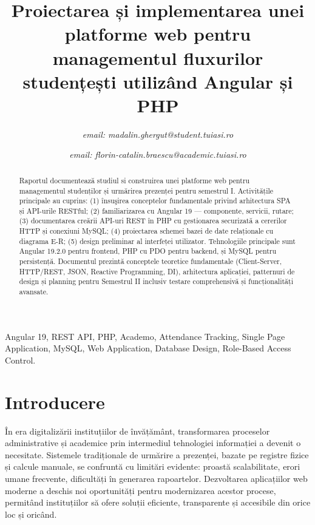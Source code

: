 \documentclass[conference]{IEEEtran}
\begin{document}
\title{Proiectarea și implementarea unei platforme web pentru managementul fluxurilor studențești utilizând Angular și PHP}

\author{
    \textit{email: madalin.ghergut@student.tuiasi.ro}
    \and
    \textit{email: florin-catalin.braescu@academic.tuiasi.ro}

}

\maketitle

\begin{abstract}
    Raportul documentează studiul si construirea unei platforme web pentru managementul studenților și urmărirea prezenței pentru semestrul I.
    Activitățile principale au cuprins: (1) însuşirea conceptelor fundamentale privind arhitectura SPA și API-urile RESTful;
    (2) familiarizarea cu Angular 19 --- componente, servicii, rutare; (3) documentarea creării API-uri REST în PHP cu gestionarea
    securizată a cererilor HTTP și conexiuni MySQL; (4) proiectarea schemei bazei de date relaționale cu diagrama E-R;
    (5) design preliminar al interfeței utilizator. Tehnologiile principale sunt Angular 19.2.0 pentru frontend,
    PHP cu PDO pentru backend, și MySQL pentru persistență. Documentul prezintă conceptele teoretice fundamentale
    (Client-Server, HTTP/REST, JSON, Reactive Programming, DI), arhitectura aplicației, patternuri de design și
    planning pentru Semestrul II inclusiv testare comprehensivă și funcționalități avansate.
\end{abstract}

\begin{IEEEkeywords}
    Angular 19, REST API, PHP, Academo, Attendance Tracking, Single Page Application, MySQL, Web Application,
    Database Design, Role-Based Access Control.
\end{IEEEkeywords}

\section{Introducere}
În era digitalizării instituțiilor de învățământ, transformarea proceselor administrative și academice prin intermediul tehnologiei
informației a devenit o necesitate. Sistemele tradiționale de urmărire a prezenței, bazate pe registre fizice și calcule manuale,
se confruntă cu limitări evidente: proastă scalabilitate, erori umane frecvente, dificultăți în generarea rapoartelor.
Dezvoltarea aplicațiilor web moderne a deschis noi oportunități pentru modernizarea acestor procese, permitând instituțiilor să ofere soluții eficiente,
transparente și accesibile din orice loc și oricând.
\end{document}
